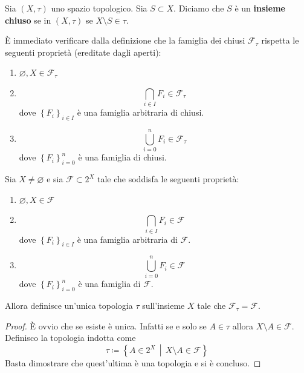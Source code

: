 \begin{definition}
	Sia $(X, \tau)$ uno spazio topologico. Sia $S \subset X$. Diciamo che $S$ è un \textbf{insieme chiuso} se in $(X,\tau)$ se $X \setminus S \in \tau$.
\end{definition}

\begin{remark}
	\label{prop_chiusi}
	È immediato verificare dalla definizione che la famiglia dei chiusi $\mathcal{F}_\tau$ rispetta le seguenti proprietà (ereditate dagli aperti):
	\begin{enumerate}
		\item $\varnothing, X \in \mathcal{F}_\tau$
		\item \begin{equation*}
				\bigcap_{i \in I} F_i \in \mathcal{F}_\tau
			\end{equation*}
		dove $\left\{F_i\right\}_{i\in I}$ è una famiglia arbitraria di chiusi.
		\item 
			\begin{equation*}
				\bigcup^{n}_{i = 0} F_i \in \mathcal{F}_\tau
			\end{equation*}
		dove $\left\{F_i\right\}^n_{i=0}$ è una famiglia di chiusi.
	\end{enumerate}
\end{remark}

\begin{lemma}
	Sia $X \neq \varnothing$ e sia $\mathcal{F} \subset 2^X$ tale che soddisfa le seguenti proprietà:
		\begin{enumerate}
		\item $\varnothing, X \in \mathcal{F}$
		\item 
			\begin{equation*}
				\bigcap_{i \in I} F_i \in \mathcal{F}
			\end{equation*}
		dove $\left\{F_i\right\}_{i\in I}$ è una famiglia arbitraria di $\mathcal{F}$.
		\item 
			\begin{equation*}
				\bigcup^{n}_{i = 0} F_i \in \mathcal{F}
			\end{equation*}
		dove $\left\{F_i\right\}^n_{i=0}$ è una famiglia di $\mathcal{F}$.
	\end{enumerate}
	Allora definisce un'unica topologia $\tau$ sull'insieme $X$ tale che $\mathcal{F}_\tau = \mathcal{F}$.
\end{lemma}
\begin{proof}
	È ovvio che se esiste è unica. Infatti se e solo se $A \in \tau$ allora $X \setminus A \in \mathcal{F}$. \\ Definisco la topologia indotta come 
	\begin{equation*}
		\tau \coloneqq \left\{ A \in 2^X \,\middle|\, X \setminus A \in \mathcal{F} \right\}
	\end{equation*}
	Basta dimostrare che quest'ultima è una topologia e si è concluso.
\end{proof}

